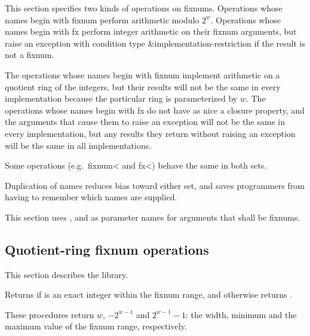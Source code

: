This section specifies two kinds of operations on fixnums.  Operations
whose names begin with {\cf fixnum} perform arithmetic modulo
$2^{w}$.  Operations whose names begin with {\cf fx}
perform integer arithmetic on their fixnum arguments, but raise an
exception with condition type {\cf\&implementation-restriction} 
if the result is not a fixnum.

\begin{rationale}
The operations whose names begin with {\cf fixnum}
implement arithmetic on a quotient ring of the integers,
but their results will not be the same in every implementation
because the particular ring is parameterized by $w$.
The operations whose names begin with {\cf fx} do
not have as nice a closure property, and the arguments that
cause them to raise an exception will not be the same in every
implementation, but any results they return without
raising an exception will be the same in all implementations.
\end{rationale}

Some operations (e.g.\ {\cf fixnum<} and {\cf fx<}) behave the same in
both sets.

\begin{rationale}
Duplication of names reduces bias toward either set,
and saves programmers from having to remember which
names are supplied.
\end{rationale}

This section uses ,  and  as parameter
names for arguments that shall be fixnums.

\subsection{Quotient-ring fixnum operations}

This section describes the  library.

\begin{entry}{%
}

Returns \schtrue{} if  is an exact
integer within the fixnum range, and
otherwise returns \schfalse{}.
\end{entry}

\begin{entry}{%
}

These procedures return $w$,
$-2^{w-1}$ and $2^{w-1} - 1$: the
width, minimum and the maximum value of the fixnum range, respectively.
\end{entry}

